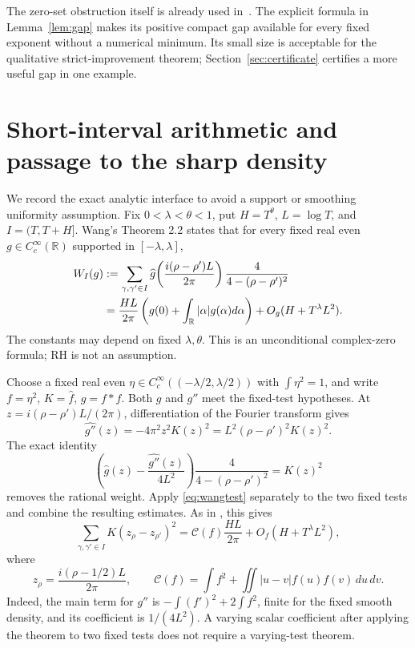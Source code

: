 \documentclass[11pt]{article}
\theoremstyle{remark}
\newcommand{\R}{\mathbb R}
\newcommand{\cC}{\mathcal C}
\begin{document}
The zero-set obstruction itself is already used in~\cite{Ainta}. The
explicit formula in Lemma~\ref{lem:gap} makes its positive compact gap
available for every fixed exponent without a numerical minimum. Its
small size is acceptable for the qualitative strict-improvement theorem;
Section~\ref{sec:certificate} certifies a more useful gap in one example.

\section{Short-interval arithmetic and passage to the sharp density}

We record the exact analytic interface to avoid a support or smoothing
uniformity assumption. Fix $0<\lambda<\theta<1$, put $H=T^\theta$,
$L=\log T$, and $I=(T,T+H]$. Wang's Theorem 2.2 states that for every
fixed real even $g\in C_c^\infty(\R)$ supported in $[-\lambda,\lambda]$,
\begin{align}\label{eq:wangtest}
 W_I(g)&:=\sum_{\gamma,\gamma'\in I}
 \widehat g\!\left(\frac{i(\rho-\rho')L}{2\pi}\right)
 \frac4{4-(\rho-\rho')^2}\notag\\
 &=\frac{HL}{2\pi}\left(g(0)+\int_\R|\alpha|g(\alpha)d\alpha\right)
      +O_g(H+T^\lambda L^2).
\end{align}
The constants may depend on fixed $\lambda,\theta$. This is an
unconditional complex-zero formula; RH is not an assumption.

Choose a fixed real even $\eta\in C_c^\infty((-\lambda/2,\lambda/2))$
with $\int\eta^2=1$, and write $f=\eta^2$, $K=\widehat f$, $g=f*f$.
Both $g$ and $g''$ meet the fixed-test hypotheses. At
$z=i(\rho-\rho')L/(2\pi)$, differentiation of the Fourier transform gives
\[
 \widehat {g''}(z)=-4\pi^2z^2K(z)^2
                  =L^2(\rho-\rho')^2K(z)^2.
\]
The exact identity
\[
 \left(\widehat g(z)-\frac{\widehat {g''}(z)}{4L^2}\right)
 \frac4{4-(\rho-\rho')^2}=K(z)^2
\]
removes the rational weight. Apply \eqref{eq:wangtest} separately to
the two fixed tests and combine the resulting estimates. As in
\cite[Lemma 3.1]{Wang}, this gives
\begin{equation}\label{eq:unweighted}
 \sum_{\gamma,\gamma'\in I}K(z_\rho-z_{\rho'})^2
 =\cC(f)\frac{HL}{2\pi}+O_f(H+T^\lambda L^2),
\end{equation}
where
\begin{equation}\label{eq:functional}
 z_\rho=\frac{i(\rho-1/2)L}{2\pi},\qquad
 \cC(f)=\int f^2+\iint|u-v|f(u)f(v)\,du\,dv.
\end{equation}
Indeed, the main term for $g''$ is
$-\int(f')^2+2\int f^2$, finite for the fixed smooth density, and its
coefficient is $1/(4L^2)$. A varying scalar coefficient after applying
the theorem to two fixed tests does not require a varying-test theorem.
\end{document}
